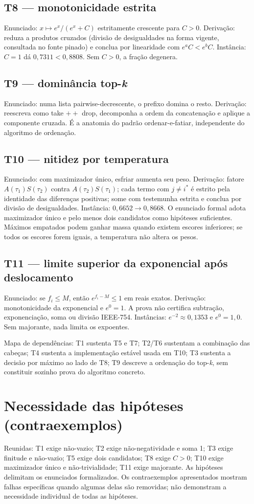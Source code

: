 \documentclass[12pt,openany,oneside,a4paper,brazil,chapter=TITLE]{abntex2}
\begin{document}
\subsection{T8 --- monotonicidade estrita}
Enunciado: $x\mapsto e^x/(e^x+C)$ estritamente crescente para $C>0$. Derivação: reduza a produtos cruzados (divisão de desigualdades na forma vigente, consultada no fonte pinado) e conclua por linearidade com $e^aC<e^bC$. Instância: $C=1$ dá $0{,}7311<0{,}8808$. Sem $C>0$, a fração degenera.
\subsection{T9 --- dominância top-\textit{k}}
Enunciado: numa lista pairwise-decrescente, o prefixo domina o resto. Derivação: reescreva como take $++$ drop, decomponha a ordem da concatenação e aplique a componente cruzada. É a anatomia do padrão ordenar-e-fatiar, independente do algoritmo de ordenação.
\subsection{T10 --- nitidez por temperatura}
Enunciado: com maximizador único, esfriar aumenta seu peso. Derivação: fatore $A(\tau_1)S(\tau_2)$ contra $A(\tau_2)S(\tau_1)$; cada termo com $j\neq i^*$ é estrito pela identidade das diferenças positivas; some com testemunha estrita e conclua por divisão de desigualdades. Instância: $0{,}6652\to0{,}8668$. O enunciado formal adota maximizador único e pelo menos dois candidatos como hipóteses suficientes. Máximos empatados podem ganhar massa quando existem escores inferiores; se todos os escores forem iguais, a temperatura não altera os pesos.
\subsection{T11 --- limite superior da exponencial após deslocamento}
Enunciado: se $f_i\leq M$, então $e^{f_i-M}\leq1$ em reais exatos. Derivação: monotonicidade da exponencial e $e^0=1$. A prova não certifica subtração, exponenciação, soma ou divisão IEEE-754. Instâncias: $e^{-2}\approx0{,}1353$ e $e^{0}=1{,}0$. Sem majorante, nada limita os expoentes.
\par Mapa de dependências: T1 sustenta T5 e T7; T2/T6 sustentam a combinação das cabeças; T4 sustenta a implementação estável usada em T10; T3 sustenta a decisão por máximo ao lado de T8; T9 descreve a ordenação do top-\textit{k}, sem constituir sozinho prova do algoritmo concreto.
\section{Necessidade das hipóteses (contraexemplos)}
Reunidas: T1 exige não-vazio; T2 exige não-negatividade e soma 1; T3 exige finitude e não-vazio; T5 exige dois candidatos; T8 exige $C>0$; T10 exige maximizador único e não-trivialidade; T11 exige majorante. As hipóteses delimitam os enunciados formalizados. Os contraexemplos apresentados mostram falhas específicas quando algumas delas são removidas; não demonstram a necessidade individual de todas as hipóteses.
\end{document}

